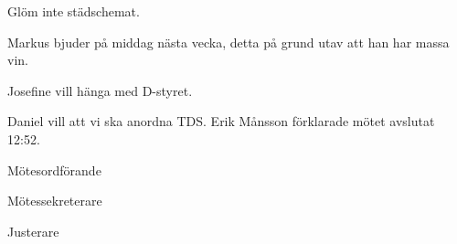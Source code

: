 \documentclass[10pt]{article}
\def\mo{Erik Månsson}
\def\ms{Johan Karlberg}
\def\ji{Daniel Bakic}
\begin{document}
\begin{paragrafer}
{\Ibfu}

Glöm inte städschemat.

Markus bjuder på middag nästa vecka, detta på grund utav att han har massa vin.

Josefine vill hänga med D-styret.

Daniel vill att vi ska anordna TDS.
{\mo} förklarade mötet avslutat 12:52.

\end{paragrafer}

\newpage
\hidesignfoot
\begin{signatures}{3}
\signature{\mo}{Mötesordförande}
\signature{\ms}{Mötessekreterare}
\signature{\ji}{Justerare}
\end{signatures}
\end{document}
